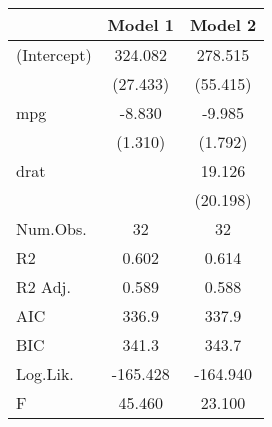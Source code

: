 \begin{table}[H]
\centering
\begin{tabular}[t]{lcc}
\toprule
  & Model 1 & Model 2\\
\midrule
(Intercept) & 324.082 & 278.515\\
 & (27.433) & (55.415)\\
mpg & -8.830 & -9.985\\
 & (1.310) & (1.792)\\
drat &  & 19.126\\
 &  & (20.198)\\
\midrule
Num.Obs. & 32 & 32\\
R2 & 0.602 & 0.614\\
R2 Adj. & 0.589 & 0.588\\
AIC & 336.9 & 337.9\\
BIC & 341.3 & 343.7\\
Log.Lik. & -165.428 & -164.940\\
F & 45.460 & 23.100\\
\bottomrule
\end{tabular}
\end{table}

